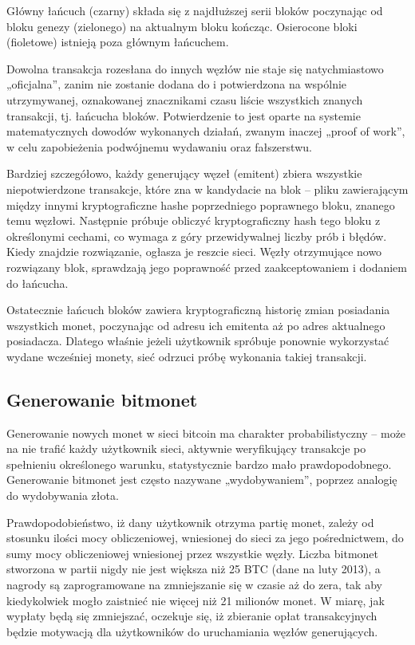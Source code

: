 \documentclass[11pt,a4paper]{article}
\begin{document}
Główny łańcuch (czarny) składa się z najdłuższej serii bloków poczynając od bloku genezy (zielonego) na aktualnym bloku kończąc. Osierocone bloki (fioletowe) istnieją poza głównym łańcuchem.

Dowolna transakcja rozesłana do innych węzłów nie staje się natychmiastowo „oficjalna”, zanim nie zostanie dodana do i potwierdzona na wspólnie utrzymywanej, oznakowanej znacznikami czasu liście wszystkich znanych transakcji, tj. łańcucha bloków. Potwierdzenie to jest oparte na systemie matematycznych dowodów wykonanych działań, zwanym inaczej „proof of work”, w celu zapobieżenia podwójnemu wydawaniu oraz fałszerstwu.

Bardziej szczegółowo, każdy generujący węzeł (emitent) zbiera wszystkie niepotwierdzone transakcje, które zna w kandydacie na blok – pliku zawierającym między innymi kryptograficzne hashe poprzedniego poprawnego bloku, znanego temu węzłowi. Następnie próbuje obliczyć kryptograficzny hash tego bloku z określonymi cechami, co wymaga z góry przewidywalnej liczby prób i błędów. Kiedy znajdzie rozwiązanie, ogłasza je reszcie sieci. Węzły otrzymujące nowo rozwiązany blok, sprawdzają jego poprawność przed zaakceptowaniem i dodaniem do łańcucha.

Ostatecznie łańcuch bloków zawiera kryptograficzną historię zmian posiadania wszystkich monet, poczynając od adresu ich emitenta aż po adres aktualnego posiadacza. Dlatego właśnie jeżeli użytkownik spróbuje ponownie wykorzystać wydane wcześniej monety, sieć odrzuci próbę wykonania takiej transakcji.

\subsection{Generowanie bitmonet}

Generowanie nowych monet w sieci bitcoin ma charakter probabilistyczny – może na nie trafić każdy użytkownik sieci, aktywnie weryfikujący transakcje po spełnieniu określonego warunku, statystycznie bardzo mało prawdopodobnego. Generowanie bitmonet jest często nazywane „wydobywaniem”, poprzez analogię do wydobywania złota. 

Prawdopodobieństwo, iż dany użytkownik otrzyma partię monet, zależy od stosunku ilości mocy obliczeniowej, wniesionej do sieci za jego pośrednictwem, do sumy mocy obliczeniowej wniesionej przez wszystkie węzły. Liczba bitmonet stworzona w partii nigdy nie jest większa niż 25 BTC (dane na luty 2013), a nagrody są zaprogramowane na zmniejszanie się w czasie aż do zera, tak aby kiedykolwiek mogło zaistnieć nie więcej niż 21 milionów monet. W miarę, jak wypłaty będą się zmniejszać, oczekuje się, iż zbieranie opłat transakcyjnych będzie motywacją dla użytkowników do uruchamiania węzłów generujących.
\end{document}
